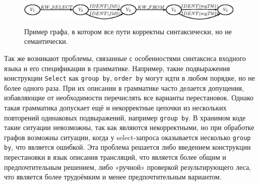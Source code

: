 \documentclass{llncs}
\begin{document}
\begin{figure}
    \begin{center}
        \includegraphics[width=11cm,height=1.3cm]{graphs/semantics_example.eps}
        \caption{ Пример графа, в котором все пути корректны синтаксически, но не семантически.}
        \label{pic7}
    \end{center}
\end{figure}

Так же возникают проблемы, связанные с особенностями синтаксиса входного языка и его спецификации в грамматике. Например, такие подвыражения конструкции \verb|Select| как \verb|group by|, \verb|order by| могут идти в любом порядке, но не более одного раза. При их описании в грамматике часто делается допущения, избавляющие от необходимости перечислять все варианты перестановок. Однако такая грамматика допускает ещё и некорректные цепочки из нескольких повторений одинаковых подвыражений, например \verb|group by|. В хранимом коде такие ситуации невозможны, так как являются некорректными, но при обработке  графов возможны ситуации, когда у select-запроса оказывается несколько \verb|group by|, что является ошибкой. Эта проблема решается либо введением конструкции перестановки в язык описания трансляций, что является более общим и предпочтительным решением, либо «ручной» проверкой результирующего леса, что является более трудоёмким и менее предпочтительным вариантом.
\end{document}
